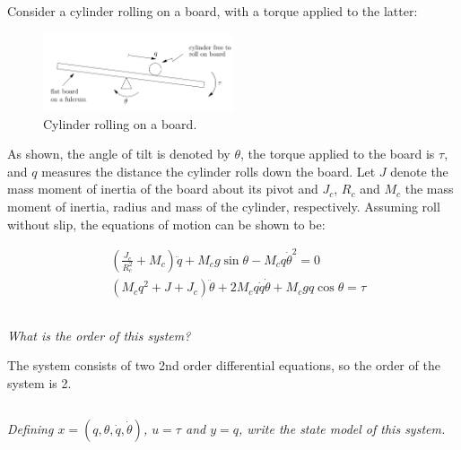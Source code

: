 \section{}
Consider a cylinder rolling on a board, with a torque applied to the latter:
\begin{figure}
    \centering
    \includegraphics[width=0.5\textwidth]{Questions/Figures/Q4ProblemDiagram.png}
    \caption{Cylinder rolling on a board.}
    \label{fig:Q4 System}
\end{figure}


As shown, the angle of tilt is denoted by $\theta$, the torque applied to the board is $\tau$, and $q$ 
measures the distance the cylinder rolls down the board. Let $J$ denote the mass moment of inertia of the board 
about its pivot and $J_c$, $R_c$ and $M_c$ the mass moment of inertia, radius and mass of the cylinder, 
respectively. Assuming roll without slip, the equations of motion can be shown to be:

\begin{align}
    &\left(\frac{J_c}{R_{c}^2} + M_c\right)\ddot{q} + M_{c}g \sin{\theta} - M_{c}q \dot{\theta}^2 = 0 \label{eq: Q4a1} \\
    &(M_{c}q^2 + J + J_c)\ddot{\theta} + 2M_{c}q \dot{q} \dot{\theta} + M_{c}gq \cos{\theta} = \tau \label{eq: Q4a2}
\end{align}

\subsection{}
\textit{What is the order of this system?}

The system consists of two 2nd order differential equations, so the order of the system is 2.
\subsection{}
\textit{Defining $x = (q, \theta, \dot{q}, \dot{\theta})$, $u = \tau$ and $y = q$, write the state model of this system.}

